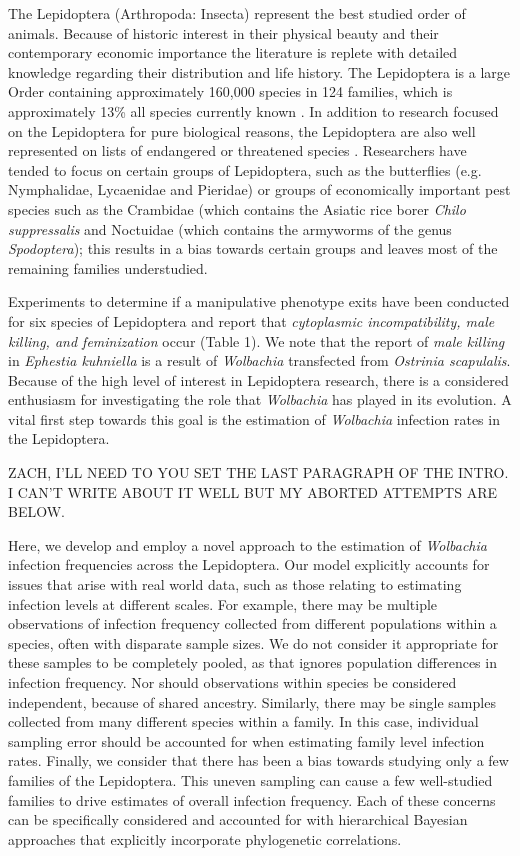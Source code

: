 \documentclass{frontiersSCNS}
\begin{document}
The Lepidoptera (Arthropoda: Insecta) represent the best studied order of animals. Because of historic interest in their physical beauty and their contemporary economic importance the literature is replete with detailed knowledge regarding their distribution and life history. The  Lepidoptera is a large Order containing approximately 160,000 species in 124 families, which is approximately 13\% all species currently known \cite{Regier:2013fp}. In addition to research focused on the Lepidoptera for pure biological reasons, the Lepidoptera are also well represented on lists of endangered or threatened species \citep{Hamm:2014wi}. Researchers have tended to focus on certain groups of Lepidoptera, such as the butterflies (e.g. Nymphalidae, Lycaenidae and Pieridae) or groups of economically important pest species such as the Crambidae (which contains the Asiatic rice borer \textit{Chilo suppressalis} and Noctuidae (which contains the armyworms of the genus \textit{Spodoptera}); this results in a bias towards certain groups and leaves most of the remaining families understudied. 

Experiments to determine if a manipulative phenotype exits have been conducted for six species of Lepidoptera and report that \emph{cytoplasmic incompatibility, male killing, \emph{and} feminization} occur (Table 1). We note that the report of \textit{male killing} in \textit{Ephestia kuhniella} is a result of \textit{Wolbachia} transfected from \textit{Ostrinia scapulalis}. Because of the high level of interest in Lepidoptera research, there is a considered enthusiasm for investigating the role that \textit{Wolbachia} has played in its evolution. A vital first step towards this goal is the estimation of \textit{Wolbachia} infection rates in the Lepidoptera. 

ZACH, I'LL NEED TO YOU SET THE LAST PARAGRAPH OF THE INTRO. I CAN'T WRITE ABOUT IT WELL BUT MY ABORTED ATTEMPTS ARE BELOW.

Here, we develop and employ a novel approach to the estimation of \textit{Wolbachia} infection frequencies across the Lepidoptera. Our model explicitly accounts for issues that arise with real world data, such as those relating to estimating infection levels at different scales. For example, there may be multiple observations of infection frequency collected from different populations within a species, often with disparate sample sizes. We do not consider it appropriate for these samples to be completely pooled, as that ignores population differences in infection frequency. Nor should observations within species be considered independent, because of shared ancestry.  Similarly, there may be single samples collected from many different species within a family. In this case, individual sampling error should be accounted for when estimating family level infection rates. Finally, we consider that there has been a bias towards studying only a few families of the Lepidoptera. This uneven sampling can cause a few well-studied families to drive estimates of overall infection frequency. Each of these concerns can be specifically considered and accounted for with hierarchical Bayesian approaches that explicitly incorporate phylogenetic correlations. 
\end{document}
